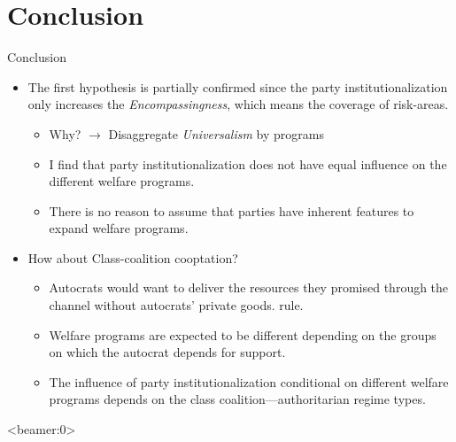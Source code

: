 \documentclass{Bredelebeamer}
\begin{document}
\section{Conclusion}
\begin{frame}{Conclusion}
	\begin{itemize}
		\item The first hypothesis is partially confirmed since
		the party institutionalization only increases the \textit{Encompassingness}, which means the coverage of risk-areas. 
		\begin{itemize}
			\item Why? $\rightarrow$ Disaggregate \textit{Universalism} by programs
			\item I find that party institutionalization does not
			have equal influence on the different welfare programs.
			\item There is no reason to assume that parties have inherent features to expand welfare programs.
		\end{itemize} 
		\item How about Class-coalition cooptation?
		\begin{itemize}
			\item Autocrats would want to deliver the resources they promised through the channel without autocrats’ private goods.
			rule. 
			\item Welfare programs are expected to be different depending on the groups on which the autocrat depends for support.
			\item The influence of party institutionalization 			conditional on different welfare programs depends on the class coalition—authoritarian regime types.
		\end{itemize}
	\end{itemize}	
\end{frame}

\begin{frame}<beamer:0>
	
	
\end{frame}
\end{document}
